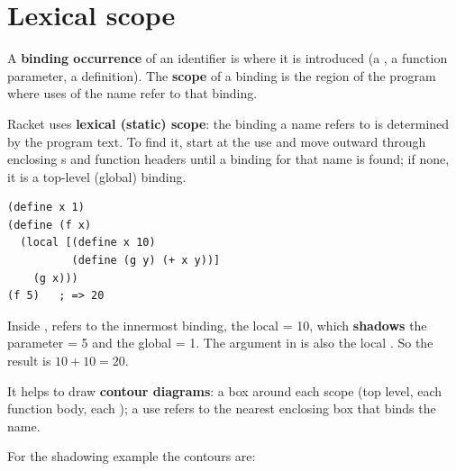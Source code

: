 \section{Lexical scope}

\begin{definition}
A \textbf{binding occurrence} of an identifier is where it is introduced
(a , a function parameter, a  definition). The
\textbf{scope} of a binding is the region of the program where uses of the
name refer to that binding.
\end{definition}

Racket uses \textbf{lexical (static) scope}: the binding a name refers to is
determined by the program text. To find it, start at the use and move outward
through enclosing s and function headers until a binding for that
name is found; if none, it is a top-level (global) binding.

\begin{example}[Shadowing]
\begin{lstlisting}[style=racket]
(define x 1)
(define (f x)
  (local [(define x 10)
          (define (g y) (+ x y))]
    (g x)))
(f 5)   ; => 20
\end{lstlisting}
Inside ,  refers to the innermost binding, the local
 = 10, which \textbf{shadows} the parameter  = 5 and the global
 = 1. The argument in  is also the local . So the
result is $10 + 10 = 20$.
\end{example}

It helps to draw \textbf{contour diagrams}: a box around each scope (top
level, each function body, each ); a use refers to the nearest
enclosing box that binds the name.

For the shadowing example the contours are:

